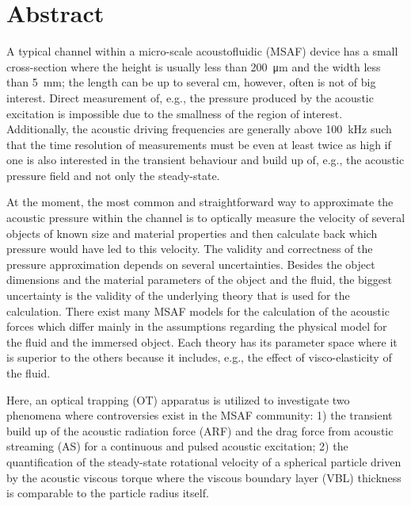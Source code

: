 \chapter*{Abstract} 

A typical channel within a micro-scale acoustofluidic (MSAF) device has a small 
cross-section where the height is usually less than \SI{200}{\um} and the width 
less than \SI{5}{\mm}; the length can be up to several \si{\cm}, however, often 
is not of big interest. Direct measurement of, e.g., the pressure produced by 
the acoustic excitation is impossible due to the smallness of the region of 
interest. Additionally, the acoustic driving frequencies are generally above 
\SI{100}{\kilo\hertz} such that the time resolution of measurements must be 
even at least twice as high if one is also interested in the transient 
behaviour and build up of, e.g., the acoustic pressure field and not only the 
steady-state.

At the moment, the most common and straightforward way to approximate the 
acoustic pressure within the channel is to optically measure the velocity of 
several objects of known size and material properties and then calculate back 
which pressure would have led to this velocity. The validity and correctness of 
the pressure approximation depends on several uncertainties. Besides the object 
dimensions and the material parameters of the object and the fluid, the biggest 
uncertainty is the validity of the underlying theory that is used for the 
calculation. There exist many MSAF models for the calculation of the acoustic 
forces which differ mainly in the assumptions regarding the physical model for 
the fluid and the immersed object. Each theory has its parameter space where it 
is superior to the others because it includes, e.g., the effect of 
visco-elasticity of the fluid.

Here, an optical trapping (OT) apparatus is utilized to investigate two 
phenomena where controversies exist in the MSAF community: 1) the transient 
build up of the acoustic radiation force (ARF) and the drag force from acoustic 
streaming (AS) for a continuous and pulsed acoustic excitation; 2) the 
quantification of the steady-state rotational velocity of a spherical particle 
driven by the acoustic viscous torque where the viscous boundary layer (VBL) 
thickness is comparable to the particle radius itself.

